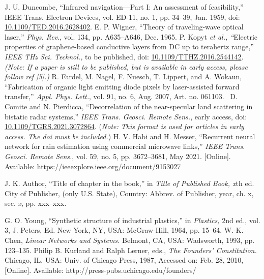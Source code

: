 \documentclass{IEEEtaes}
\begin{document}
\vspace*{-12pt}
\begin{thebibliography}{[34]}
\setcounter{enumiv}{0}
J. U. Duncombe, ``Infrared navigation---Part I: An assessment of feasibility,'' IEEE Trans. Electron Devices, vol. ED-11, no. 1, pp. 34--39, Jan. 1959, doi: \href{https://dx.doi.org/10.1109/TED.2016.2628402}{10.1109/TED.2016.2628402}.
E. P. Wigner, ``Theory of traveling-wave optical laser,'' \emph{Phys. Rev}., vol. 134, pp. A635--A646, Dec. 1965.
P. Kopyt \emph{et al., ``}Electric properties of graphene-based conductive layers from DC up to terahertz range,'' \emph{IEEE THz Sci. Technol.,} to be published, doi: \href{https://dx.doi.org/10.1109/TTHZ.2016.2544142}{10.1109/TTHZ.2016.2544142}. \emph{(Note: If a paper is still to be published, but is available in early access, please follow ref {[}5{]}.)}
R. Fardel, M. Nagel, F. Nuesch, T. Lippert, and A. Wokaun,  ``Fabrication of organic light emitting diode pixels by laser-assisted forward transfer,'' \emph{Appl. Phys. Lett.}, vol. 91, no. 6, Aug. 2007, Art. no. 061103.~
D. Comite and N. Pierdicca, ``Decorrelation of the near-specular land scattering in bistatic radar systems,'' \emph{IEEE Trans. Geosci. Remote Sens.}, early access, doi: \href{https://dx.doi.org/10.1109/TGRS.2021.3072864}{10.1109/TGRS.2021.3072864}. (\emph{Note: This format is used for articles in early access. The doi must be included.})
H. V. Habi and H. Messer, ``Recurrent neural network for rain estimation using commercial microwave links,'' \emph{IEEE Trans. Geosci. Remote Sens.}, vol. 59, no. 5, pp. 3672--3681, May 2021. {[}Online{]}. Available: https://ieeexplore.ieee.org/document/9153027
\end{thebibliography}


\vspace*{-12pt}
\begin{thebibliography}{[34]}
\item[] J. K. Author, ``Title of chapter in the book,'' in \emph{Title of Published Book, x}th ed. City of Publisher, (only U.S. State), Country: Abbrev. of Publisher, year, ch. x, sec. \emph{x}, pp. xxx--xxx\emph{.}
\end{thebibliography}


\vspace*{-12pt}
\begin{thebibliography}{[34]}
\setcounter{enumiv}{6}
G. O. Young, ``Synthetic structure of industrial plastics,'' in \emph{Plastics,} 2nd ed., vol. 3, J. Peters, Ed. New York, NY, USA: McGraw-Hill, 1964, pp. 15--64.
W.-K. Chen, \emph{Linear Networks and Systems.} Belmont, CA, USA: Wadsworth, 1993, pp. 123--135.
Philip B. Kurland and Ralph Lerner, eds., \emph{The Founders' Constitution.} Chicago, IL, USA: Univ. of Chicago Press, 1987, Accessed on: Feb. 28, 2010, {[}Online{]}. Available: http://press-pubs.uchicago.edu/founders/
\end{thebibliography}
\end{document}
